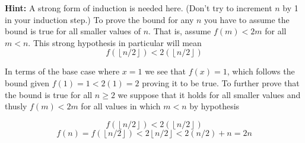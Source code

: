 \documentclass[10pt]{article}
\begin{document}
\textbf{Hint:} A strong form of induction is needed here.  (Don't try to increment $n$ by 1 in your induction step.) To prove the bound for any $n$ you have to assume the bound is true for all smaller values of $n$.  That is, assume $f(m) < 2m$ for all $m<n$.  This strong hypothesis in particular will mean
$$f(\left \lfloor{n/2}\right \rfloor) < 2(\left \lfloor{n/2}\right \rfloor)$$

In terms of the base case where $x = 1$ we see that $f(x) = 1$, which follows the bound given $f(1) = 1 < 2(1) = 2$ proving it to be true.  To further prove that the bound is true for all $n \geq 2$ we suppose that it holds for all smaller values and thusly $f(m) < 2m$ for all values in which $m < n$ by hypothesis

$$f(\left \lfloor{n/2}\right \rfloor) < 2(\left \lfloor{n/2}\right \rfloor)$$
$$f(n) = f(\left \lfloor{n/2}\right \rfloor) < 2\left \lfloor{n/2}\right \rfloor < 2(n/2) + n = 2n$$
\end{document}
